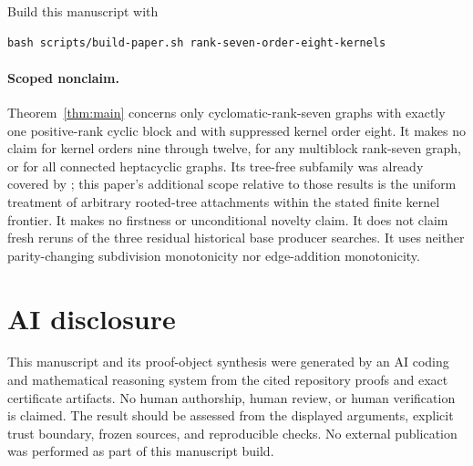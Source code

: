\documentclass[11pt]{article}
\theoremstyle{remark}
\begin{document}
Build this manuscript with
\begin{verbatim}
bash scripts/build-paper.sh rank-seven-order-eight-kernels
\end{verbatim}

\paragraph{Scoped nonclaim.}
Theorem~\ref{thm:main} concerns only cyclomatic-rank-seven graphs with exactly
one positive-rank cyclic block and with suppressed kernel order eight.  It
makes no claim for kernel orders nine through twelve, for any multiblock
rank-seven graph, or for all connected heptacyclic graphs.  Its tree-free
subfamily was already covered by \cite{AHLTwoConnected,AHLMinDegree}; this
paper's additional scope relative to those results is the uniform treatment of
arbitrary rooted-tree attachments within the stated finite kernel frontier.
It makes no firstness or unconditional novelty claim.  It does not claim fresh
reruns of the three residual historical base producer searches.  It uses
neither parity-changing subdivision monotonicity nor edge-addition
monotonicity.

\section*{AI disclosure}
This manuscript and its proof-object synthesis were generated by an AI coding
and mathematical reasoning system from the cited repository proofs and exact
certificate artifacts.  No human authorship, human review, or human
verification is claimed.  The result should be assessed from the displayed
arguments, explicit trust boundary, frozen sources, and reproducible checks.
No external publication was performed as part of this manuscript build.
\end{document}
